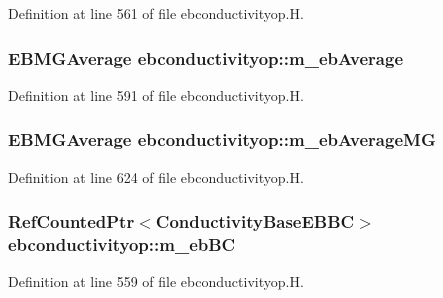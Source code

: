Definition at line 561 of file ebconductivityop.\+H.

\subsubsection[{\texorpdfstring{m\+\_\+eb\+Average}{m_ebAverage}}]{\setlength{\rightskip}{0pt plus 5cm}E\+B\+M\+G\+Average ebconductivityop\+::m\+\_\+eb\+Average\hspace{0.3cm}{\ttfamily [protected]}}\hypertarget{classebconductivityop_aa24a66f5fd4538ffe9d4c4509b10f58b}{}\label{classebconductivityop_aa24a66f5fd4538ffe9d4c4509b10f58b}


Definition at line 591 of file ebconductivityop.\+H.

\subsubsection[{\texorpdfstring{m\+\_\+eb\+Average\+MG}{m_ebAverageMG}}]{\setlength{\rightskip}{0pt plus 5cm}E\+B\+M\+G\+Average ebconductivityop\+::m\+\_\+eb\+Average\+MG\hspace{0.3cm}{\ttfamily [protected]}}\hypertarget{classebconductivityop_af1b5f3fa9911431b84a4fc2cc1f2d8f1}{}\label{classebconductivityop_af1b5f3fa9911431b84a4fc2cc1f2d8f1}


Definition at line 624 of file ebconductivityop.\+H.

\subsubsection[{\texorpdfstring{m\+\_\+eb\+BC}{m_ebBC}}]{\setlength{\rightskip}{0pt plus 5cm}Ref\+Counted\+Ptr$<$Conductivity\+Base\+E\+B\+BC$>$ ebconductivityop\+::m\+\_\+eb\+BC\hspace{0.3cm}{\ttfamily [protected]}}\hypertarget{classebconductivityop_a3779a8f0f407ad7539898f3ab3d38db3}{}\label{classebconductivityop_a3779a8f0f407ad7539898f3ab3d38db3}


Definition at line 559 of file ebconductivityop.\+H.

